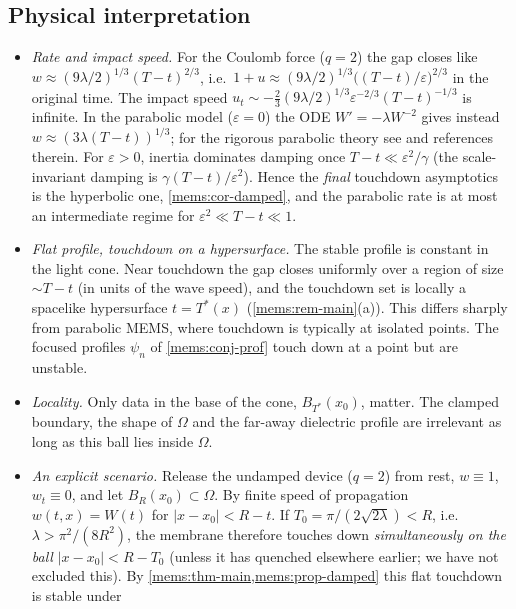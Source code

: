 \subsection{Physical interpretation}
\label{mems:sec-phys}
\begin{itemize}[leftmargin=1.2em]
\item \emph{Rate and impact speed.} For the Coulomb force ($q=2$) the gap
closes like $w\approx(9\lambda/2)^{1/3}(T-t)^{2/3}$, i.e.\
$1+u\approx(9\lambda/2)^{1/3}\big((T-t)/\varepsilon\big)^{2/3}$ in the original time.
The impact speed $u_t\sim-\frac23(9\lambda/2)^{1/3}\varepsilon^{-2/3}(T-t)^{-1/3}$
is infinite. In the parabolic model ($\varepsilon=0$) the ODE
$W'=-\lambda W^{-2}$ gives instead $w\approx(3\lambda(T-t))^{1/3}$; for the
rigorous parabolic theory see \cite{EspositoGhoussoubGuo2010} and references
therein.
For $\varepsilon>0$, inertia dominates damping once
$T-t\ll\varepsilon^2/\gamma$ (the scale-invariant damping is $\gamma(T-t)/\varepsilon^2$).
Hence the \emph{final} touchdown asymptotics is the hyperbolic one,
\cref{mems:cor-damped}, and the parabolic rate is at most an intermediate
regime for $\varepsilon^2\ll T-t\ll1$.
\item \emph{Flat profile, touchdown on a hypersurface.} The stable profile is
constant in the light cone. Near touchdown the gap closes uniformly over a
region of size $\sim T-t$ (in units of the wave speed), and the touchdown set
is locally a spacelike hypersurface $t=T^*(x)$
(\cref{mems:rem-main}(a)). This differs sharply from parabolic MEMS, where
touchdown is typically at isolated points. The focused profiles $\psi_n$ of
\cref{mems:conj-prof} touch down at a point but are unstable.
\item \emph{Locality.} Only data in the base of the cone, $B_{T^*}(x_0)$, matter.
The clamped boundary, the shape of $\Omega$ and the far-away dielectric profile are
irrelevant as long as this ball lies inside $\Omega$.
\item \emph{An explicit scenario.} Release the undamped device ($q=2$) from rest,
$w\equiv1$, $w_t\equiv0$, and let $B_R(x_0)\subset\Omega$. By finite speed of
propagation $w(t,x)=W(t)$ for $|x-x_0|<R-t$. If
$T_0=\pi/(2\sqrt{2\lambda})<R$, i.e.\ $\lambda>\pi^2/(8R^2)$, the membrane therefore
touches down \emph{simultaneously on the ball} $|x-x_0|<R-T_0$ (unless it has
quenched elsewhere earlier; we have not excluded this). By
\cref{mems:thm-main,mems:prop-damped} this flat touchdown is stable under

\end{itemize}
